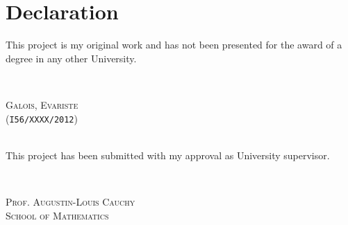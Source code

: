 \section*{Declaration}
This project is my original work and has not been presented for the award of a degree in any other University.\\[2.0cm]
\begin{minipage}[t]{.5\textwidth}
\begin{flushleft}
\signature{Signature:}{~}
\end{flushleft}
\end{minipage}%
%
\begin{minipage}[t]{.5\textwidth}
\begin{flushright}
\signature{Date:}{\textsc{Galois, Evariste}\\(\texttt{I56/XXXX/2012})}
\end{flushright}
\end{minipage}\\[4.0cm]%


\noindent This project has been submitted with my approval as University supervisor.\\[2.0cm]
\begin{minipage}[t]{.5\textwidth}
\begin{flushleft}
\signature{Signature:}{~}
\end{flushleft}
\end{minipage}%
%
\begin{minipage}[t]{.5\textwidth}
\begin{flushright}
\signature{Date:}{\textsc{Prof. Augustin-Louis Cauchy}\\\textsc{School of Mathematics}}
\end{flushright}
\end{minipage}\\[2cm]%


\clearpage
\begin{abstractpage}

\end{abstractpage}

% 

